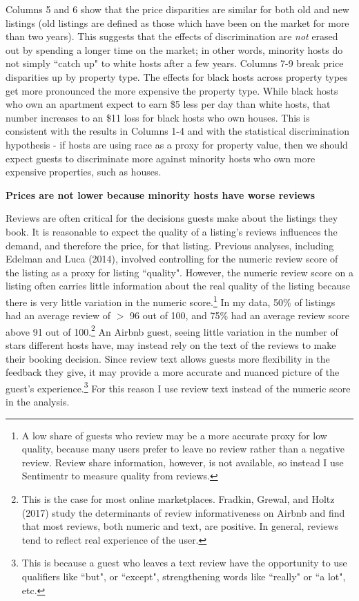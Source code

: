 Columns 5 and 6 show that the price disparities are similar for both old and new listings (old listings are defined as those which have been on the market for more than two years). This suggests that the effects of discrimination are \textit{not} erased out by spending a longer time on the market; in other words, minority hosts do not simply ``catch up" to white hosts after a few years. Columns 7-9 break price disparities up by property type. The effects for black hosts across property types get more pronounced the more expensive the property type. While black hosts who own an apartment expect to earn \$5 less per day than white hosts, that number increases to an \$11 loss for black hosts who own houses. This is consistent with the results in Columns 1-4 and with the statistical discrimination hypothesis - if hosts are using race as a proxy for property value, then we should expect guests to discriminate more against minority hosts who own more expensive properties, such as houses.   


\textbf{Prices are not lower because minority hosts have worse reviews} 

Reviews are often critical for the decisions guests make about the listings they book. It is reasonable to expect the quality of a listing's reviews influences the demand, and therefore the price, for that listing. Previous analyses, including Edelman and Luca (2014), involved controlling for the numeric review score of the listing as a proxy for listing ``quality". However, the numeric review score on a listing often carries little information about the real quality of the listing because there is very little variation in the numeric score.\footnote{A low share of guests who review may be a more accurate proxy for low quality, because many users prefer to leave no review rather than a negative review. Review share information, however, is not available, so instead I use Sentimentr to measure quality from reviews.} In my data, 50\% of listings had an average review of $>$ 96 out of 100, and 75\% had an average review score above 91 out of 100.\footnote{This is the case for most online marketplaces. Fradkin, Grewal, and Holtz (2017) study the determinants of review informativeness on Airbnb and find that most reviews, both numeric and text, are positive. In general, reviews tend to reflect real experience of the user.\cite{fradkin}} An Airbnb guest, seeing little variation in the number of stars different hosts have, may instead rely on the text of the reviews to make their booking decision. Since review text allows guests more flexibility in the feedback they give, it may provide a more accurate and nuanced picture of the guest's experience.\footnote{This is because a guest who leaves a text review have the opportunity to use qualifiers like ``but", or ``except", strengthening words like ``really" or ``a lot", etc.} For this reason I use review text instead of the numeric score in the analysis. 

